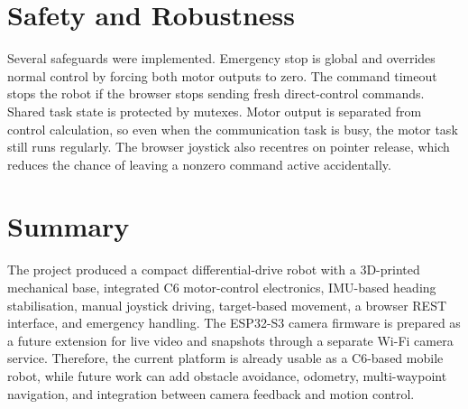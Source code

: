 \documentclass[11pt,a4paper]{article}
\begin{document}
\section{Safety and Robustness}

Several safeguards were implemented. Emergency stop is global and overrides
normal control by forcing both motor outputs to zero. The command timeout stops
the robot if the browser stops sending fresh direct-control commands. Shared
task state is protected by mutexes. Motor output is separated from control
calculation, so even when the communication task is busy, the motor task still
runs regularly. The browser joystick also recentres on pointer release, which
reduces the chance of leaving a nonzero command active accidentally.

\section{Summary}

The project produced a compact differential-drive robot with a 3D-printed
mechanical base, integrated C6 motor-control electronics, IMU-based heading
stabilisation, manual joystick driving, target-based movement, a browser REST
interface, and emergency handling. The ESP32-S3 camera firmware is prepared as
a future extension for live video and snapshots through a separate Wi-Fi camera
service. Therefore, the current platform is already usable as a C6-based mobile
robot, while future work can add obstacle avoidance, odometry, multi-waypoint
navigation, and integration between camera feedback and motion control.
\end{document}
